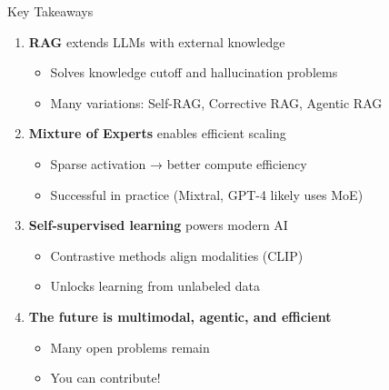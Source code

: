 \documentclass[aspectratio=169]{beamer}
\begin{document}
\begin{frame}[shrink=10]{Key Takeaways 🔑}
\begin{enumerate}\setlength{\itemsep}{0pt}
    \item \textbf{RAG} extends LLMs with external knowledge
    \begin{itemize}\setlength{\itemsep}{0pt}
        \item Solves knowledge cutoff and hallucination problems
        \item Many variations: Self-RAG, Corrective RAG, Agentic RAG
    \end{itemize}

    \vspace{0.3em}

    \item \textbf{Mixture of Experts} enables efficient scaling
    \begin{itemize}\setlength{\itemsep}{0pt}
        \item Sparse activation → better compute efficiency
        \item Successful in practice (Mixtral, GPT-4 likely uses MoE)
    \end{itemize}

    \vspace{0.3em}

    \item \textbf{Self-supervised learning} powers modern AI
    \begin{itemize}\setlength{\itemsep}{0pt}
        \item Contrastive methods align modalities (CLIP)
        \item Unlocks learning from unlabeled data
    \end{itemize}

    \vspace{0.3em}

    \item \textbf{The future is multimodal, agentic, and efficient}
    \begin{itemize}\setlength{\itemsep}{0pt}
        \item Many open problems remain
        \item You can contribute!
    \end{itemize}
\end{enumerate}
\end{frame}
\end{document}
